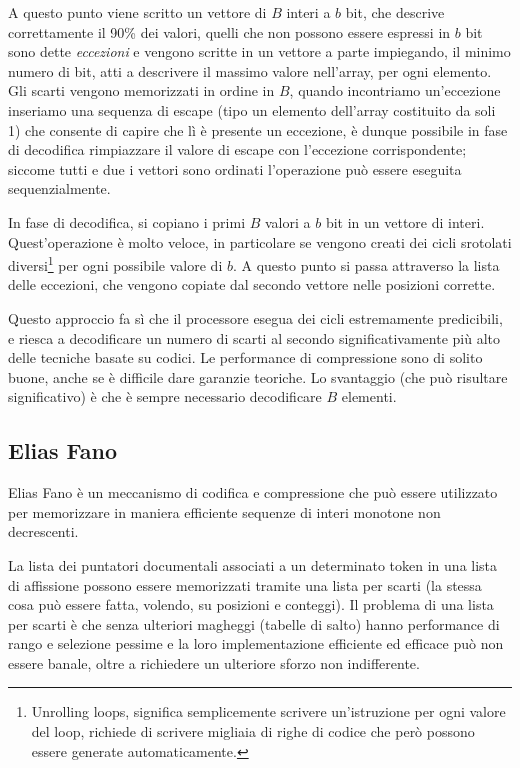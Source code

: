 A questo punto viene scritto un vettore di $B$ interi a $b$ bit, che descrive correttamente il 90\% dei valori, quelli che non possono essere espressi in $b$ bit sono dette \textit{eccezioni} e vengono scritte in un vettore a parte impiegando, il minimo numero di bit, atti a descrivere il massimo valore nell'array, per ogni elemento. Gli scarti vengono memorizzati in ordine in $B$, quando incontriamo un'eccezione inseriamo una sequenza di escape (tipo un elemento dell'array costituito da soli 1) che consente di capire che lì è presente un eccezione, è dunque possibile in fase di decodifica rimpiazzare il valore di escape con l'eccezione corrispondente; siccome tutti e due i vettori sono ordinati l'operazione può essere eseguita sequenzialmente.

In fase di decodifica, si copiano i primi $B$ valori a $b$ bit in un vettore di interi. Quest'operazione è molto veloce, in particolare se vengono creati dei cicli srotolati diversi\footnote{Unrolling loops, significa semplicemente scrivere un'istruzione per ogni valore del loop, richiede di scrivere migliaia di righe di codice che però possono essere generate automaticamente.} per ogni possibile valore di $b$. A questo punto si passa attraverso la lista delle eccezioni, che vengono copiate dal secondo vettore nelle posizioni corrette.

Questo approccio fa sì che il processore esegua dei cicli estremamente predicibili, e riesca a decodificare un numero di scarti al secondo significativamente più alto delle tecniche basate su codici. Le performance di compressione sono di solito buone, anche se è difficile dare garanzie teoriche. Lo svantaggio (che può risultare significativo) è che è sempre necessario decodificare $B$ elementi.
\subsection{Elias Fano}
Elias Fano è un meccanismo di codifica e compressione che può essere utilizzato per memorizzare in maniera efficiente sequenze di interi monotone non decrescenti.

La lista dei puntatori documentali associati a un determinato token in una lista di affissione possono essere memorizzati tramite una lista per scarti (la stessa cosa può essere fatta, volendo, su posizioni e conteggi). Il problema di una lista per scarti è che senza ulteriori magheggi (tabelle di salto) hanno performance di rango e selezione pessime e la loro implementazione efficiente ed efficace può non essere banale, oltre a richiedere un ulteriore sforzo non indifferente.

